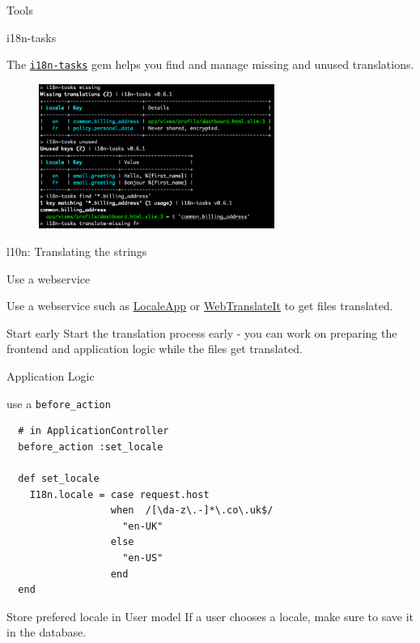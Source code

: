 \documentclass{beamer}
\begin{document}
\begin{frame}[fragile]{Tools}
\begin{block}{i18n-tasks}

The \href{https://github.com/globalize/globalize}{\lstinline{i18n-tasks}} gem helps you find and manage missing and unused translations.

\begin{figure}[ht!]
\centering
\includegraphics[width=77mm]{i18ntasks.png}
\end{figure}

\end{block}
\end{frame}

\begin{frame}[fragile]{l10n: Translating the strings}
\begin{block}{Use a webservice}

Use a webservice such as \href{http://localeapp.com}{LocaleApp} or \href{http://webtranslateit.com}{WebTranslateIt} to get files translated.

\end{block}

\begin{block}{Start early}
Start the translation process early - you can work on preparing the frontend and application logic while the files get translated.
\end{block}

\end{frame}

\begin{frame}[fragile]{Application Logic}
\begin{block}{use a \lstinline{before_action}}

\begin{lstlisting}
  # in ApplicationController
  before_action :set_locale

  def set_locale
    I18n.locale = case request.host
                  when  /[\da-z\.-]*\.co\.uk$/
                    "en-UK"
                  else
                    "en-US"
                  end
  end
\end{lstlisting}

\end{block}

\begin{block}{Store prefered locale in User model}
If a user chooses a locale, make sure to save it in the database.
\end{block}

\end{frame}
\end{document}
